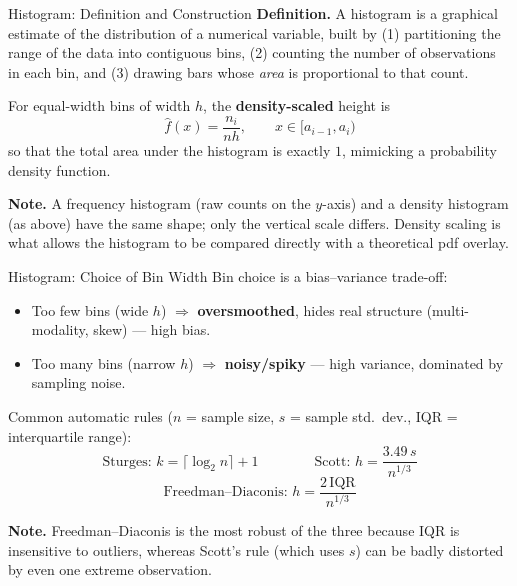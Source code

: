 \documentclass[11pt,aspectratio=169]{beamer}
\newcommand{\Def}[1]{\textbf{Definition.} #1}
\newcommand{\Note}[1]{\textbf{Note.} #1}
\begin{document}
\begin{frame}{Histogram: Definition and Construction}
\Def{A histogram is a graphical estimate of the distribution of a
numerical variable, built by (1) partitioning the range of the data into
contiguous bins, (2) counting the number of observations in each bin, and
(3) drawing bars whose \emph{area} is proportional to that count.}

For equal-width bins of width $h$, the \textbf{density-scaled} height is
\[
      \hat{f}(x) = \frac{n_i}{n h}, \qquad x \in [a_{i-1}, a_i)
\]
so that the total area under the histogram is exactly $1$, mimicking a
probability density function.

\Note{A frequency histogram (raw counts on the $y$-axis) and a density
histogram (as above) have the same shape; only the vertical scale differs.
Density scaling is what allows the histogram to be compared directly with a
theoretical pdf overlay.}
\end{frame}

\begin{frame}{Histogram: Choice of Bin Width}
Bin choice is a bias--variance trade-off:
\begin{itemize}
    \item Too few bins (wide $h$) $\Rightarrow$ \textbf{oversmoothed}, hides
          real structure (multi-modality, skew) — high bias.
    \item Too many bins (narrow $h$) $\Rightarrow$ \textbf{noisy/spiky} —
          high variance, dominated by sampling noise.
\end{itemize}

Common automatic rules ($n$ = sample size, $s$ = sample std.\ dev., IQR =
interquartile range):
\[
    \text{Sturges: } k = \lceil \log_2 n \rceil + 1
    \qquad\qquad
    \text{Scott: } h = \frac{3.49\,s}{n^{1/3}}
\]
\[
    \text{Freedman--Diaconis: } h = \frac{2\,\text{IQR}}{n^{1/3}}
\]

\Note{Freedman--Diaconis is the most robust of the three because IQR is
insensitive to outliers, whereas Scott's rule (which uses $s$) can be
badly distorted by even one extreme observation.}
\end{frame}
\end{document}
